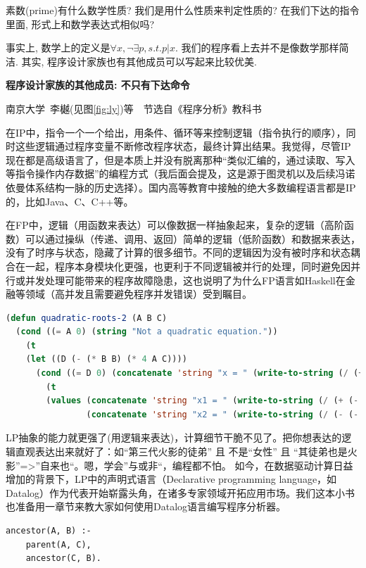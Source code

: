 \begin{bonus}
	素数(prime)有什么数学性质? 我们是用什么性质来判定性质的? 在我们下达的指令里面, 形式上和数学表达式相似吗? 
\end{bonus}

事实上, 数学上的定义是$\forall x, \lnot \exists p, s.t. p|x$. 我们的程序看上去并不是像数学那样简洁. 其实, 程序设计家族也有其他成员可以写起来比较优美. 



\begin{pas}
	\begin{center}
		\large \textbf{程序设计家族的其他成员: 不只有下达命令}
		
	\end{center}
	\begin{center}
		南京大学~李樾(见图\ref{fig:ly})等~~节选自《程序分析》教科书
	\end{center}
	在IP中，指令一个一个给出，用条件、循环等来控制逻辑（指令执行的顺序），同时这些逻辑通过程序变量不断修改程序状态，最终计算出结果。我觉得，尽管IP现在都是高级语言了，但是本质上并没有脱离那种“类似汇编的，通过读取、写入等指令操作内存数据”的编程方式（我后面会提及，这是源于图灵机以及后续冯诺依曼体系结构一脉的历史选择）。国内高等教育中接触的绝大多数编程语言都是IP的，比如Java、C、C++等。
	
在FP中，逻辑（用函数来表达）可以像数据一样抽象起来，复杂的逻辑（高阶函数）可以通过操纵（传递、调用、返回）简单的逻辑（低阶函数）和数据来表达，没有了时序与状态，隐藏了计算的很多细节。不同的逻辑因为没有被时序和状态耦合在一起，程序本身模块化更强，也更利于不同逻辑被并行的处理，同时避免因并行或并发处理可能带来的程序故障隐患，这也说明了为什么FP语言如Haskell在金融等领域（高并发且需要避免程序并发错误）受到瞩目。

\begin{lstlisting}[language=lisp]
	(defun quadratic-roots-2 (A B C)
  (cond ((= A 0) (string "Not a quadratic equation."))
    (t
    (let ((D (- (* B B) (* 4 A C))))
      (cond ((= D 0) (concatenate 'string "x = " (write-to-string (/ (+ (- B) (sqrt D)) (* 2 A)))))
        (t
        (values (concatenate 'string "x1 = " (write-to-string (/ (+ (- B) (sqrt D)) (* 2 A))))
                (concatenate 'string "x2 = " (write-to-string (/ (- (- B) (sqrt D)) (* 2 A)))))))))))
\end{lstlisting}

LP抽象的能力就更强了(用逻辑来表达)，计算细节干脆不见了。把你想表达的逻辑直观表达出来就好了：如“第三代火影的徒弟” 且 不是“女性” 且 “其徒弟也是火影”=>”自来也“。嗯，学会”与或非“，编程都不怕。 如今，在数据驱动计算日益增加的背景下，LP中的声明式语言（Declarative programming language，如Datalog）作为代表开始崭露头角，在诸多专家领域开拓应用市场。我们这本小书也准备用一章节来教大家如何使用Datalog语言编写程序分析器。
	\begin{lstlisting}
ancestor(A, B) :-
    parent(A, C),
    ancestor(C, B).
	\end{lstlisting}
\end{pas}



